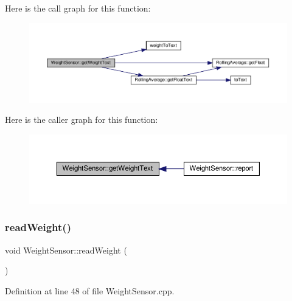 Here is the call graph for this function\+:
\nopagebreak
\begin{figure}[H]
\begin{center}
\leavevmode
\includegraphics[width=350pt]{class_weight_sensor_a4435433225f8b58950161e5a580d763e_cgraph}
\end{center}
\end{figure}
Here is the caller graph for this function\+:
\nopagebreak
\begin{figure}[H]
\begin{center}
\leavevmode
\includegraphics[width=350pt]{class_weight_sensor_a4435433225f8b58950161e5a580d763e_icgraph}
\end{center}
\end{figure}
\mbox{\label{class_weight_sensor_ac4a6f05281cc7fa0c602e2f0b2efdbaa}} 
\subsubsection{\texorpdfstring{read\+Weight()}{readWeight()}\hspace{0.1cm}{\footnotesize\ttfamily [1/2]}}
{\footnotesize\ttfamily void Weight\+Sensor\+::read\+Weight (\begin{DoxyParamCaption}{ }\end{DoxyParamCaption})}



Definition at line 48 of file Weight\+Sensor.\+cpp.

